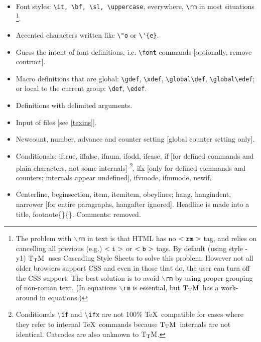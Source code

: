 \documentclass[12pt]{article}
\def\TtM{$\rm{}T_TH$}
\def\TtM{$\rm{}T_TM$}%
\begin{document}
\begin{itemize}

\item{}
Font styles: \verb|\it, \bf, \sl, \uppercase|, everywhere,
\verb|\rm| in most situations
\footnote{The problem with {\tt$\backslash$rm} in text is that HTML
has no {$\tt <rm>$} tag, and relies on cancelling all previous (e.g.)
{$\tt <i>$} or {$\tt <b>$} tags. By default (using style -y1)
\TtM\ uses Cascading Style Sheets to solve this problem. However not
all older browsers support CSS and even in those that do, the user can
turn off the CSS support. The best solution is to avoid
{\tt$\backslash$rm} by using proper grouping of non-roman text. (In
equations {\tt$\backslash$rm} is essential, but \TtM\ has a
work-around in equations.)}.

\item Accented characters written like \verb|\"o| or \verb|\'{e}|. 

\item Guess the intent of font definitions, i.e. \verb|\font| commands
[optionally, remove contruct].

\item Macro definitions that are global: \verb|\gdef|, \verb|\xdef|,
\verb|\global\def|, \verb|\global\edef|; or local to the
current group: \verb|\def|, \verb|\edef|.
 
\item Definitions with delimited arguments.

\item Input of files [see \ref{texins}].

\item Newcount, number, advance and counter setting [global counter setting
only].
\label{ifs}

\item Conditionals: iftrue,
iffalse,
ifnum,
ifodd,
ifcase,
if   [for defined commands and plain characters, not some internals]
\footnote{Conditionals {$\tt\backslash$\tt{}if}
 and {$\tt\backslash$\tt{}ifx} are not 100\% \TeX\ compatible for cases
where they refer to internal \TeX\ commands because \TtM\ internals are
not identical. Catcodes are also unknown to \TtM.}, ifx [only for
defined commands and counters; internals appear undefined], ifvmode,
ifmmode, newif.

\item Centerline, beginsection, item, itemitem, obeylines; hang, hangindent,
narrower [for entire paragraphs, hangafter ignored].
 Headline is made
into a title, footnote\{\}\{\}. Comments: removed.


\end{itemize}
\end{document}
